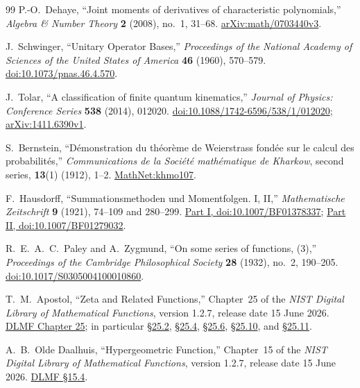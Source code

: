 \begin{thebibliography}{99}
P.-O.~Dehaye,
\textquotedblleft{}Joint moments of derivatives of characteristic polynomials,''
\emph{Algebra \& Number Theory} \textbf{2} (2008), no.~1, 31--68.
\href{https://arxiv.org/abs/math/0703440v3}{arXiv:math/0703440v3}.

J.~Schwinger,
\textquotedblleft{}Unitary Operator Bases,''
\emph{Proceedings of the National Academy of Sciences of the United States of America}
\textbf{46} (1960), 570--579.
\href{https://doi.org/10.1073/pnas.46.4.570}{doi:10.1073/pnas.46.4.570}.

J.~Tolar,
\textquotedblleft{}A classification of finite quantum kinematics,''
\emph{Journal of Physics: Conference Series} \textbf{538} (2014), 012020.
\href{https://doi.org/10.1088/1742-6596/538/1/012020}{doi:10.1088/1742-6596/538/1/012020};
\href{https://arxiv.org/abs/1411.6390v1}{arXiv:1411.6390v1}.

S.~Bernstein,
\textquotedblleft{}Démonstration du théorème de Weierstrass fondée sur le calcul des
probabilités,''
\emph{Communications de la Société mathématique de Kharkow}, second series,
\textbf{13}(1) (1912), 1--2.
\href{https://www.mathnet.ru/eng/khmo107}{MathNet:khmo107}.

F.~Hausdorff,
\textquotedblleft{}Summationsmethoden und Momentfolgen. I, II,''
\emph{Mathematische Zeitschrift} \textbf{9} (1921), 74--109 and 280--299.
\href{https://doi.org/10.1007/BF01378337}{Part I, doi:10.1007/BF01378337};
\href{https://doi.org/10.1007/BF01279032}{Part II, doi:10.1007/BF01279032}.

R.~E.~A.~C.~Paley and A.~Zygmund,
\textquotedblleft{}On some series of functions, (3),''
\emph{Proceedings of the Cambridge Philosophical Society} \textbf{28} (1932), no.~2,
190--205.
\href{https://doi.org/10.1017/S0305004100010860}{doi:10.1017/S0305004100010860}.

T.~M.~Apostol,
\textquotedblleft{}Zeta and Related Functions,''
Chapter~25 of the \emph{NIST Digital Library of Mathematical Functions},
version 1.2.7, release date 15 June 2026.
\href{https://dlmf.nist.gov/25}{DLMF Chapter 25}; in particular
\href{https://dlmf.nist.gov/25.2}{\S25.2},
\href{https://dlmf.nist.gov/25.4}{\S25.4},
\href{https://dlmf.nist.gov/25.6}{\S25.6},
\href{https://dlmf.nist.gov/25.10}{\S25.10}, and
\href{https://dlmf.nist.gov/25.11}{\S25.11}.

A.~B.~Olde Daalhuis,
\textquotedblleft{}Hypergeometric Function,''
Chapter~15 of the \emph{NIST Digital Library of Mathematical Functions},
version 1.2.7, release date 15 June 2026.
\href{https://dlmf.nist.gov/15.4}{DLMF \S15.4}.


\end{thebibliography}
